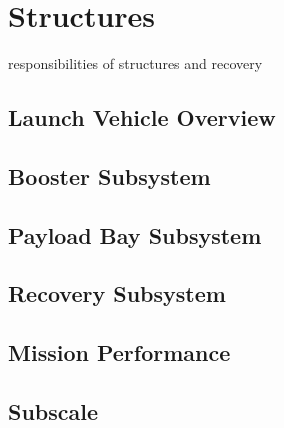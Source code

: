 \chapter{Structures}
responsibilities of structures and recovery

\section{Launch Vehicle Overview}
\section{Booster Subsystem}
\section{Payload Bay Subsystem}
\section{Recovery Subsystem}
\section{Mission Performance}
\section{Subscale}

